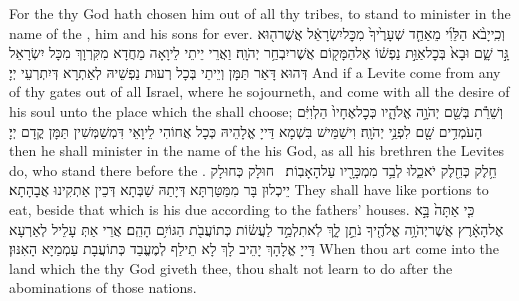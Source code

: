 {For the \lord\space thy God hath chosen him out of all thy tribes, to stand to minister in the name of the \lord, him and his sons for ever.}{}
{וְכִֽי\maqqaf יָבֹ֨א הַלֵּוִ֜י מֵאַחַ֤ד שְׁעָרֶ֙יךָ֙ מִכׇּל\maqqaf יִשְׂרָאֵ֔ל אֲשֶׁר\maqqaf ה֖וּא גָּ֣ר שָׁ֑ם וּבָא֙ בְּכׇל\maqqaf אַוַּ֣ת נַפְשׁ֔וֹ אֶל\maqqaf הַמָּק֖וֹם אֲשֶׁר\maqqaf יִבְחַ֥ר יְהֹוָֽה׃}
{וַאֲרֵי יֵיתֵי לֵיוָאָה מֵחֲדָא מִקִּרְוָךְ מִכָּל יִשְׂרָאֵל דְּהוּא דָּאַר תַּמָּן וְיֵיתֵי בְּכָל רְעוּת נַפְשֵׁיהּ לְאַתְרָא דְּיִתְרְעֵי יְיָ׃}
{And if a Levite come from any of thy gates out of all Israel, where he sojourneth, and come with all the desire of his soul unto the place which the \lord\space shall choose;}{}
{וְשֵׁרֵ֕ת בְּשֵׁ֖ם יְהֹוָ֣ה אֱלֹהָ֑יו כְּכׇל\maqqaf אֶחָיו֙ הַלְוִיִּ֔ם הָעֹמְדִ֥ים שָׁ֖ם לִפְנֵ֥י יְהֹוָֽה׃}
{וִישַׁמֵּישׁ בִּשְׁמָא דַּייָ אֱלָהֵיהּ כְּכָל אֲחוֹהִי לֵיוָאֵי דִּמְשַׁמְּשִׁין תַּמָּן קֳדָם יְיָ׃}
{then he shall minister in the name of the \lord\space his God, as all his brethren the Levites do, who stand there before the \lord.}{}
{חֵ֥לֶק כְּחֵ֖לֶק יֹאכֵ֑לוּ לְבַ֥ד מִמְכָּרָ֖יו עַל\maqqaf הָאָבֽוֹת׃ \setuma }
{חוּלָק כְּחוּלָק יֵיכְלוּן בָּר מִמַּטַּרְתָּא דְּיָתַהּ שַׁבְּתָא דְּכֵין אַתְקִינוּ אֲבָהָתָא׃}
{They shall have like portions to eat, beside that which is his due according to the fathers’ houses.}{}
{כִּ֤י אַתָּה֙ בָּ֣א אֶל\maqqaf הָאָ֔רֶץ אֲשֶׁר\maqqaf יְהֹוָ֥ה אֱלֹהֶ֖יךָ נֹתֵ֣ן לָ֑ךְ לֹֽא\maqqaf תִלְמַ֣ד לַעֲשׂ֔וֹת כְּתוֹעֲבֹ֖ת הַגּוֹיִ֥ם הָהֵֽם׃}
{אֲרֵי אַתְּ עָלֵיל לְאַרְעָא דַּייָ אֱלָהָךְ יָהֵיב לָךְ לָא תֵילַף לְמֶעֱבַד כְּתוֹעֲבָת עַמְמַיָּא הָאִנּוּן׃}
{When thou art come into the land which the \lord\space thy God giveth thee, thou shalt not learn to do after the abominations of those nations.}{}
